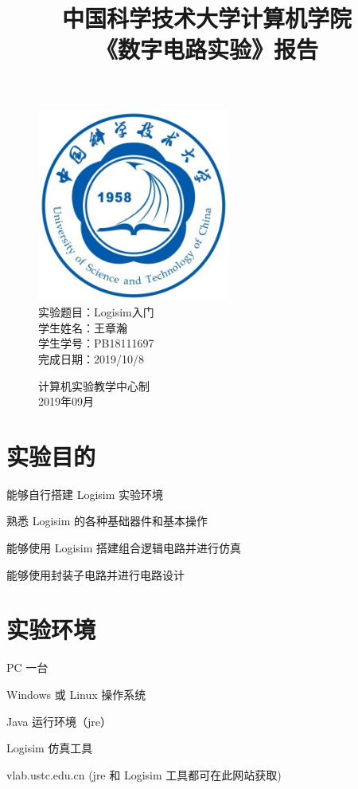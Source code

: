 \documentclass[UTF8]{article}
\title{中国科学技术大学计算机学院\\《数字电路实验》报告}
\author{}
\date{}
\begin{document}
	\maketitle
	\begin{figure}[H]
		\centering
		\includegraphics[width=2.5in]{xiaohui.jpg}\vspace{0.5cm}\\
		\large{
			实验题目：Logisim入门\\
			学生姓名：王章瀚\\
			学生学号：PB18111697\\
			完成日期：2019/10/8\\
		}\vspace{2cm}
		
		\large{计算机实验教学中心制\\2019年09月\\}
		\thispagestyle{empty}
		\clearpage  %
	\end{figure}


	\section{实验目的}
	能够自行搭建 Logisim 实验环境\par
	熟悉 Logisim 的各种基础器件和基本操作\par
	能够使用 Logisim 搭建组合逻辑电路并进行仿真\par
	能够使用封装子电路并进行电路设计\par
	
	\section{实验环境}
	PC 一台\par
	Windows 或 Linux 操作系统\par
	Java 运行环境（jre）\par
	Logisim 仿真工具\par
	vlab.ustc.edu.cn (jre 和 Logisim 工具都可在此网站获取)\par
	
\end{document}
